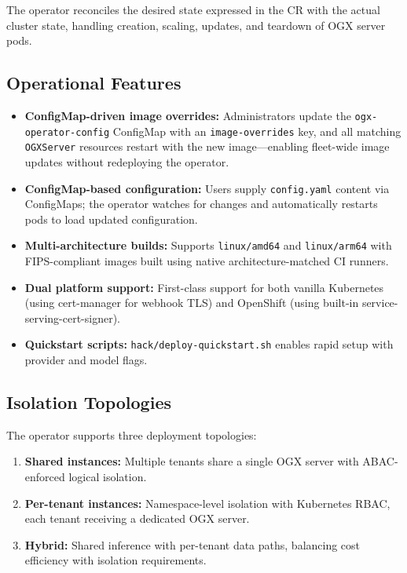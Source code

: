 \documentclass[11pt]{article}
\begin{document}
The operator reconciles the desired state expressed in the CR with the actual cluster state, handling creation, scaling, updates, and teardown of OGX server pods.

\subsection{Operational Features}

\begin{itemize}[nosep]
  \item \textbf{ConfigMap-driven image overrides:} Administrators update the \texttt{ogx-operator-config} ConfigMap with an \texttt{image-overrides} key, and all matching \texttt{OGXServer} resources restart with the new image---enabling fleet-wide image updates without redeploying the operator.
  \item \textbf{ConfigMap-based configuration:} Users supply \texttt{config.yaml} content via ConfigMaps; the operator watches for changes and automatically restarts pods to load updated configuration.
  \item \textbf{Multi-architecture builds:} Supports \texttt{linux/amd64} and \texttt{linux/arm64} with FIPS-compliant images built using native architecture-matched CI runners.
  \item \textbf{Dual platform support:} First-class support for both vanilla Kubernetes (using cert-manager for webhook TLS) and OpenShift (using built-in service-serving-cert-signer).
  \item \textbf{Quickstart scripts:} \texttt{hack/deploy-quickstart.sh} enables rapid setup with provider and model flags.
\end{itemize}

\subsection{Isolation Topologies}

The operator supports three deployment topologies:
\begin{enumerate}[nosep]
  \item \textbf{Shared instances:} Multiple tenants share a single OGX server with ABAC-enforced logical isolation.
  \item \textbf{Per-tenant instances:} Namespace-level isolation with Kubernetes RBAC, each tenant receiving a dedicated OGX server.
  \item \textbf{Hybrid:} Shared inference with per-tenant data paths, balancing cost efficiency with isolation requirements.
\end{enumerate}
\end{document}
